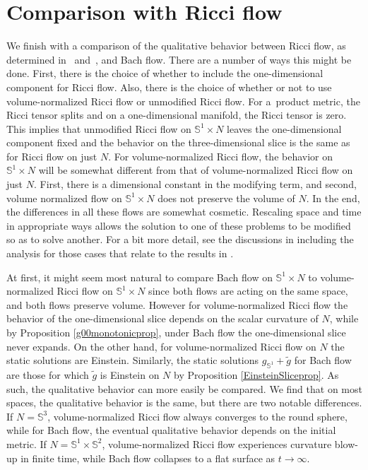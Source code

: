 \documentclass[pdftex]{sigma}
\numberwithin{equation}{section}
\begin{document}
\section{Comparison with Ricci flow} \label{riccompsec}

We finish with a comparison of the qualitative behavior between Ricci flow, as determined in~\cite{IJ} and~\cite{IJL}, and Bach flow. There are a number of ways this might be done. First, there is the choice of whether to include the one-dimensional component for Ricci flow. Also, there is the choice of whether or not to use volume-normalized Ricci flow or unmodified Ricci flow. For a~product metric, the Ricci tensor splits and on a one-dimensional manifold, the Ricci tensor is zero. This implies that unmodified Ricci flow on $\mathbb{S}^1 \times N$ leaves the one-dimensional component fixed and the behavior on the three-dimensional slice is the same as for Ricci flow on just $N$. For volume-normalized Ricci flow, the behavior on $\mathbb{S}^1 \times N$ will be somewhat different from that of volume-normalized Ricci flow on just $N$. First, there is a dimensional constant in the modifying term, and second, volume normalized flow on $\mathbb{S}^1 \times N$ does not preserve the volume of $N$. In the end, the differences in all these flows are somewhat cosmetic. Rescaling space and time in appropriate ways allows the solution to one of these problems to be modified so as to solve another. For a bit more detail, see the discussions in \cite{IJL} including the analysis for those cases that relate to the results in \cite{IJ}.

At first, it might seem most natural to compare Bach flow on $\mathbb{S}^1 \times N$ to volume-normalized Ricci flow on $\mathbb{S}^1 \times N$ since both flows are acting on the same space, and both flows preserve volume. However for volume-normalized Ricci flow the behavior of the one-dimensional slice depends on the scalar curvature of $N$, while by Proposition \ref{g00monotonicprop}, under Bach flow the one-dimensional slice never expands. On the other hand, for volume-normalized Ricci flow on $N$ the static solutions are Einstein. Similarly, the static solutions $g_{\mathbb{S}^1} \! + \tilde{g}$ for Bach flow are those for which $\tilde{g}$ is Einstein on $N$ by Proposition \ref{EinsteinSliceprop}. As such, the qualitative behavior can more easily be compared. We find that on most spaces, the qualitative behavior is the same, but there are two notable differences. If $N = \mathbb{S}^3$, volume-normalized Ricci flow always converges to the round sphere, while for Bach flow, the eventual qualitative behavior depends on the initial metric. If $N = \mathbb{S}^1 \times \mathbb{S}^2$, volume-normalized Ricci flow experiences curvature blow-up in finite time, while Bach flow collapses to a flat surface as $t \rightarrow \infty$.
\end{document}
